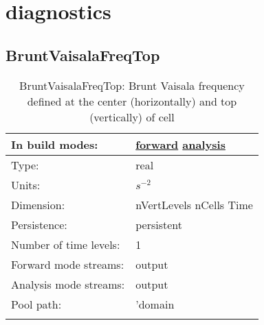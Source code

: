 \section[diagnostics]{diagnostics}
\label{sec:var_sec_diagnostics}
\subsection[BruntVaisalaFreqTop]{BruntVaisalaFreqTop}
\label{subsec:var_sec_diagnostics_BruntVaisalaFreqTop}
\begin{center}
\begin{longtable}{| p{2.0in} | p{4.0in} |}
        \hline 
        In build modes: & \hyperref[subsec:forward_var_tab_diagnostics]{forward} \hyperref[subsec:analysis_var_tab_diagnostics]{analysis} \\
        \hline 
        Type: & real \\
        \hline 
        Units: & $s^{-2}$ \\
        \hline 
        Dimension: & nVertLevels nCells Time \\
        \hline 
        Persistence: & persistent \\
        \hline 
        Number of time levels: & 1 \\
        \hline 
		 Forward mode streams: &  output \\
        \hline 
		 Analysis mode streams: &  output \\
        \hline 
            Pool path: & 'domain %
 \\
		 \hline 
    \caption{BruntVaisalaFreqTop: Brunt Vaisala frequency defined at the center (horizontally) and top (vertically) of cell}
\end{longtable}
\end{center}
